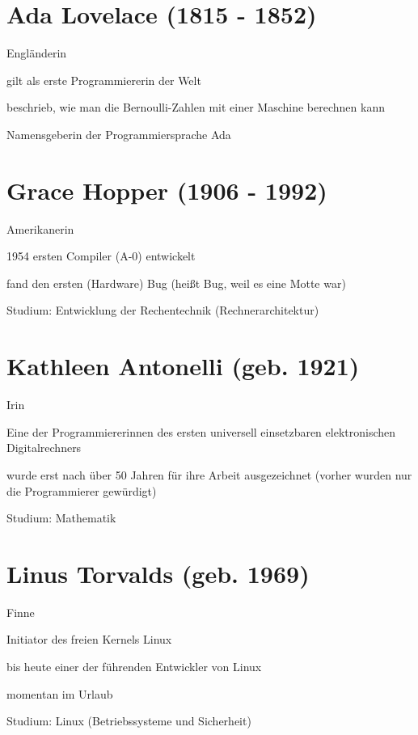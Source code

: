 \documentclass[a4paper,12pt]{scrreprt}
\begin{document}
\section*{Ada Lovelace (1815 - 1852)}
\begin{itemize*}
    \item Engländerin
    \item gilt als erste Programmiererin der Welt
    \item beschrieb, wie man die Bernoulli-Zahlen mit einer Maschine berechnen kann
    \item Namensgeberin der Programmiersprache Ada
\end{itemize*}

\section*{Grace Hopper (1906 - 1992)}
\begin{itemize*}
    \item Amerikanerin
    \item 1954 ersten Compiler (A-0) entwickelt
    \item fand den ersten (Hardware) Bug (heißt Bug, weil es eine Motte war)
    \item Studium: Entwicklung der Rechentechnik (Rechnerarchitektur)
\end{itemize*}


\section*{Kathleen Antonelli (geb. 1921)}
\begin{itemize*}
    \item Irin
    \item Eine der Programmiererinnen des ersten universell einsetzbaren elektronischen Digitalrechners
    \item wurde erst nach über 50 Jahren für ihre Arbeit ausgezeichnet (vorher wurden nur die Programmierer gewürdigt)
    \item Studium: Mathematik
\end{itemize*}

\section*{Linus Torvalds (geb. 1969)}
\begin{itemize*}
    \item Finne
    \item Initiator des freien Kernels Linux
    \item bis heute einer der führenden Entwickler von Linux
    \item momentan im Urlaub
    \item Studium: Linux (Betriebssysteme und Sicherheit)
\end{itemize*}
\end{document}
